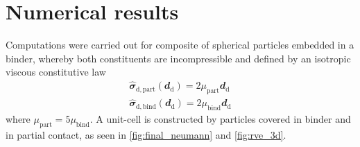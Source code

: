 \documentclass[12pt,a4paper]{article}
\renewcommand{\ts}[1]{\mathbfit{#1}}
\renewcommand{\dev}{\mathrm{d}}
\newcommand{\particle}{\mathrm{part}}
\begin{document}
\section{Numerical results}
\newcommand{\binder}{\mathrm{bind}}

Computations were carried out for composite of spherical particles embedded in a binder, whereby both constituents are incompressible and defined by an isotropic viscous constitutive law
\begin{align}
 \hat{\ts\sigma}_{\dev,\particle}(\ts d_\dev) = 2 \mu_\particle \ts d_\dev
\\
 \hat{\ts\sigma}_{\dev,\binder}(\ts d_\dev) = 2 \mu_\binder \ts d_\dev
\end{align}
where $\mu_\particle = 5\mu_\binder$.
A unit-cell is constructed by particles covered in binder and in partial contact, as seen in \cref{fig:final_neumann} and \cref{fig:rve_3d}.

\end{document}
